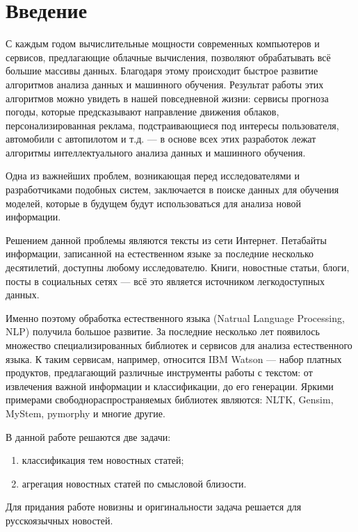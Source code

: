 \documentclass[a4paper, 14pt]{extarticle}
\begin{document}

\section{Введение}
С каждым годом вычислительные мощности современных компьютеров и сервисов, 
предлагающие облачные вычисления, позволяют 
обрабатывать всё большие массивы данных. Благодаря этому происходит быстрое 
развитие алгоритмов анализа данных и машинного обучения. Результат работы 
этих алгоритмов можно увидеть в нашей повседневной жизни: 
сервисы прогноза погоды, которые предсказывают направление движения 
облаков, персонализированная реклама, подстраивающиеся под 
интересы пользователя, автомобили с автопилотом и т.д. --- в основе всех 
этих разработок лежат алгоритмы интеллектуального анализа данных и 
машинного обучения.

Одна из важнейших проблем, возникающая перед исследователями и 
разработчиками подобных систем, заключается в поиске данных для обучения моделей,
которые в будущем будут использоваться для анализа новой информации.

Решением данной проблемы являются тексты из сети Интернет.
Петабайты информации, записанной на естественном языке за последние несколько 
десятилетий, доступны любому исследователю. Книги, новостные статьи, блоги, посты в 
социальных сетях --- всё это является источником легкодоступных данных.

Именно поэтому обработка естественного языка (Natrual Language Processing, 
NLP) получила большое развитие. За последние несколько лет появилось множество 
специализированных библиотек и сервисов для анализа естественного языка. К таким сервисам, 
например, относится IBM Watson --- набор платных продуктов, предлагающий различные
инструменты работы с текстом: от извлечения важной информации и 
классификации, до его генерации. %
Яркими примерами свободнораспространяемых библиотек являются: NLTK, Gensim, MyStem,
pymorphy и многие другие.

В данной работе решаются две задачи:
\begin{enumerate}
	\item классификация тем новостных статей;
	\item агрегация новостных статей по смысловой близости.
\end{enumerate} 
Для придания работе новизны и оригинальности задача решается для русскоязычных новостей.
\end{document}
